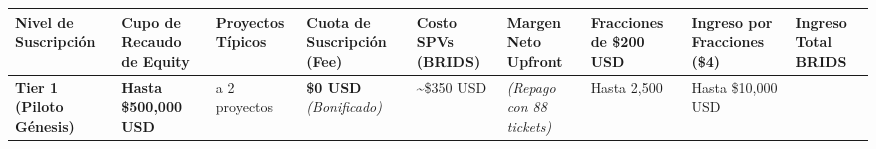 \documentclass[
]{article}
\newcounter{none} %
\begin{document}
{\def\LTcaptype{none} %
\begin{longtable}[]{@{}
  >{\raggedright\arraybackslash}p{}
  >{\centering\arraybackslash}p{}
  >{\centering\arraybackslash}p{}
  >{\centering\arraybackslash}p{}
  >{\centering\arraybackslash}p{}
  >{\centering\arraybackslash}p{}
  >{\centering\arraybackslash}p{}
  >{\centering\arraybackslash}p{}
  >{\centering\arraybackslash}p{}@{}}
\toprule\noalign{}
\begin{minipage}[b]{\linewidth}\raggedright
Nivel de Suscripción
\end{minipage} & \begin{minipage}[b]{\linewidth}\centering
Cupo de Recaudo de Equity
\end{minipage} & \begin{minipage}[b]{\linewidth}\centering
Proyectos Típicos
\end{minipage} & \begin{minipage}[b]{\linewidth}\centering
Cuota de Suscripción (Fee)
\end{minipage} & \begin{minipage}[b]{\linewidth}\centering
Costo SPVs (BRIDS)
\end{minipage} & \begin{minipage}[b]{\linewidth}\centering
\textbf{Margen Neto Upfront}
\end{minipage} & \begin{minipage}[b]{\linewidth}\centering
Fracciones de \$200 USD
\end{minipage} & \begin{minipage}[b]{\linewidth}\centering
Ingreso por Fracciones (\$4)
\end{minipage} & \begin{minipage}[b]{\linewidth}\centering
\textbf{Ingreso Total BRIDS}
\end{minipage} \\
\midrule\noalign{}
\endhead
\bottomrule\noalign{}
\endlastfoot
\textbf{Tier 1 (Piloto Génesis)} & \textbf{Hasta \$500,000 USD} & 1 a 2
proyectos & \textbf{\$0 USD} \emph{(Bonificado)} & \textasciitilde\$350
USD & \emph{(Repago con 88 tickets)} & Hasta 2,500 & Hasta \$10,000 USD

\end{longtable}}
\end{document}
